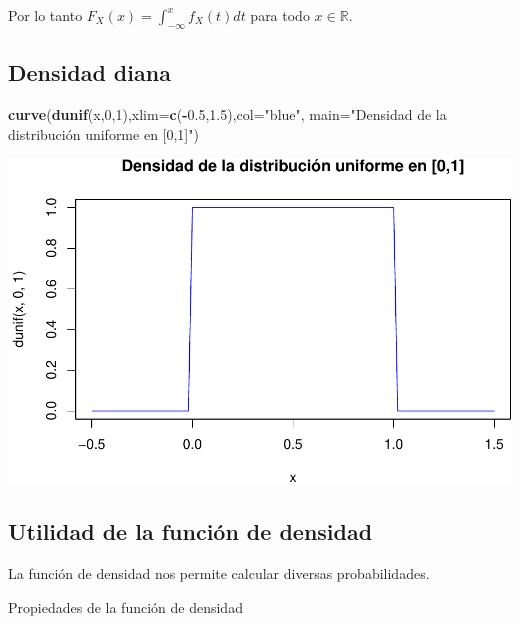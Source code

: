 \documentclass[]{book}
\newenvironment{Shaded}{\begin{snugshade}}{\end{snugshade}}
\newcommand{\DataTypeTok}[1]{\textcolor[rgb]{0.13,0.29,0.53}{#1}}
\newcommand{\DecValTok}[1]{\textcolor[rgb]{0.00,0.00,0.81}{#1}}
\newcommand{\FloatTok}[1]{\textcolor[rgb]{0.00,0.00,0.81}{#1}}
\newcommand{\KeywordTok}[1]{\textcolor[rgb]{0.13,0.29,0.53}{\textbf{#1}}}
\newcommand{\NormalTok}[1]{#1}
\newcommand{\OperatorTok}[1]{\textcolor[rgb]{0.81,0.36,0.00}{\textbf{#1}}}
\newcommand{\StringTok}[1]{\textcolor[rgb]{0.31,0.60,0.02}{#1}}
\begin{document}
Por lo tanto \(F_X(x)=\displaystyle\int_{-\infty}^x f_X(t) dt\) para todo \(x\in\mathbb{R}.\)

\hypertarget{densidad-diana-1}{%
\subsection{Densidad diana}\label{densidad-diana-1}}

\begin{Shaded}
\begin{Highlighting}[]
\KeywordTok{curve}\NormalTok{(}\KeywordTok{dunif}\NormalTok{(x,}\DecValTok{0}\NormalTok{,}\DecValTok{1}\NormalTok{),}\DataTypeTok{xlim=}\KeywordTok{c}\NormalTok{(}\OperatorTok{-}\FloatTok{0.5}\NormalTok{,}\FloatTok{1.5}\NormalTok{),}\DataTypeTok{col=}\StringTok{"blue"}\NormalTok{,}
      \DataTypeTok{main=}\StringTok{"Densidad de la distribución uniforme en [0,1]"}\NormalTok{)}
\end{Highlighting}
\end{Shaded}

\begin{center}\includegraphics{curso-probabilidad-udemy_files/figure-latex/unnamed-chunk-10-1} \end{center}

\hypertarget{utilidad-de-la-funciuxf3n-de-densidad}{%
\subsection{Utilidad de la función de densidad}\label{utilidad-de-la-funciuxf3n-de-densidad}}

La función de densidad nos permite calcular diversas probabilidades.

Propiedades de la función de densidad
\end{document}
